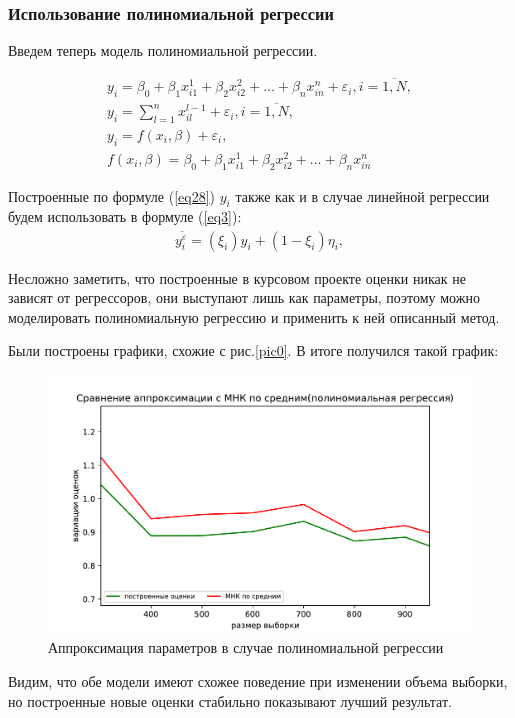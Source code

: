 \newpage

\subsubsection{Использование полиномиальной регрессии}
Введем теперь модель полиномиальной регрессии.

\begin{equation}
    \begin{array}{c}
        \label{eq28}y_i=\beta_0+\beta_1 x_{i1}^1+\beta_2 x_{i2}^2+\dots+\beta_n x_{in}^n+\varepsilon_i, i=\overline{1,N},\\
        y_i = \sum\limits_{l=1}^{n} x_{il}^{l-1} + \varepsilon_i, i=\overline{1,N},\\
        y_i= f(x_i,\beta)+\varepsilon_i,\\
        f(x_i,\beta)=\beta_0+\beta_1 x_{i1}^1+\beta_2 x_{i2}^2+\dots+\beta_n x_{in}^n
    \end{array}
\end{equation}

Построенные по формуле (\ref{eq28}) $y_i$ также как и в случае линейной регрессии будем использовать в формуле (\ref{eq3}):
\begin{eqnarray}
    y_i^{\widetilde{\varepsilon}}=(\xi_i)y_i+ (1-\xi_i)\eta_i,
\end{eqnarray}

Несложно заметить, что построенные в курсовом проекте оценки никак не зависят от регрессоров, они выступают лишь как параметры, поэтому можно моделировать полиномиальную регрессию и применить к ней описанный метод.

Были построены графики, схожие с рис.\ref{pic0}. В итоге получился такой график:
\begin{figure}[h!]
    \centering
    \includegraphics[width=150mm]{../images/polynomial.pdf}
    \caption{Аппроксимация параметров в случае полиномиальной регрессии\label{overflow}}
    \label{pic3}
\end{figure}

Видим, что обе модели имеют схожее поведение при изменении объема выборки, но построенные новые оценки стабильно показывают лучший результат.